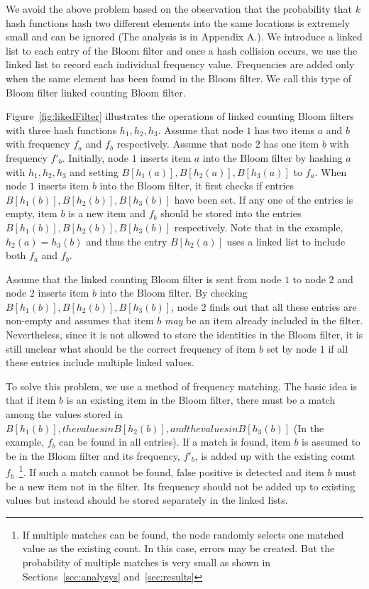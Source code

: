 \documentclass[11pt,twocolumn]{IEEEtran} %
\begin{document}
We avoid the above problem based on the observation that the probability that $k$ hash functions hash two different elements into the same locations is extremely small and can be ignored (The analysis is in Appendix A.). We introduce a linked list to each entry of the Bloom filter and once a hash collision occurs, we use the linked list to record each individual frequency value. Frequencies are added only when the same element has been found in the Bloom filter. We call this type of Bloom filter linked counting Bloom filter. 

Figure~\ref{fig:likedFilter} illustrates the operations of linked counting Bloom filters with three hash functions $h_1, h_2, h_3$. Assume that node $1$ has two items $a$ and $b$ with frequency $f_a$ and $f_b$ respectively. Assume that node $2$ has one item $b$ with frequency $f'_b$. Initially, node $1$ inserts item $a$ into the Bloom filter by hashing $a$ with $h_1, h_2, h_3$ and setting $B[h_1(a)], B[h_2(a)], B[h_3(a)]$ to $f_a$. When node $1$ inserts item $b$ into the Bloom filter, it first checks if entries $B[h_1(b)], B[h_2(b)], B[h_3(b)]$ have been set. If any one of the entries is empty, item $b$ is a new item and $f_b$ should be stored into the entries $B[h_1(b)], B[h_2(b)], B[h_3(b)]$ respectively. Note that in the example, $h_2(a) = h_3(b)$ and thus the entry $B[h_2(a)]$ uses a linked list to include both $f_a$ and $f_b$. 

Assume that the linked counting Bloom filter is sent from node $1$ to node $2$ and node $2$ inserts item $b$ into the Bloom filter. By checking $B[h_1(b)], B[h_2(b)], B[h_3(b)]$, node $2$ finds out that all these entries are non-empty and assumes that item $b$ \textit{may} be an item already included in the filter. Nevertheless, since it is not allowed to store the identities in the Bloom filter, it is still unclear what should be the correct frequency of item $b$ set by node $1$ if all these entries include multiple linked values. 

To solve this problem, we use a method of frequency matching. The basic idea is that if item $b$ is an existing item in the Bloom filter, there must be a match among the values stored in $B[h_1(b)], the values in B[h_2(b)], and the values in B[h_3(b)]$ (In the example, $f_b$ can be found in all entries). If a match is found, item $b$ is assumed to be in the Bloom filter and its frequency, $f'_b$, is added up with the existing count $f_b$~\footnote{If multiple matches can be found, the node randomly selects one matched value as the existing count. In this case, errors may be created. But the probability of multiple matches is very small as shown in Sections~\ref{sec:analysys} and~\ref{sec:results}}. If such a match cannot be found, false positive is detected and item $b$ must be a new item not in the filter. Its frequency should not be added up to existing values but instead should be stored separately in the linked lists.   
\end{document}
